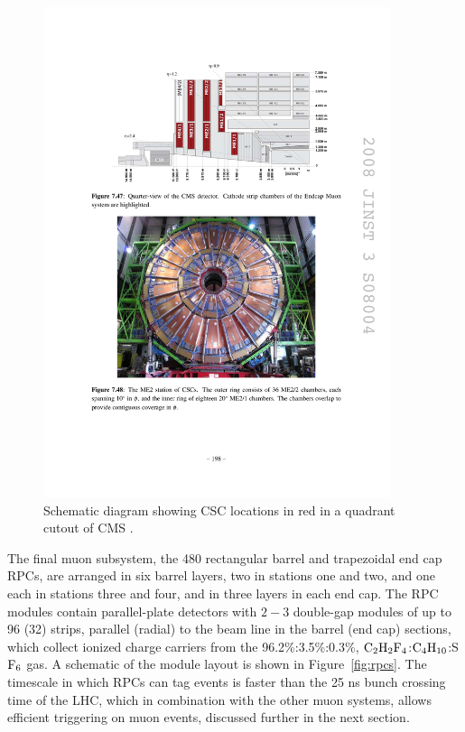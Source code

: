 \begin{figure}[tbh]
\centering
\includegraphics[width=4in]{figures/cscs.pdf}
\caption{Schematic diagram showing CSC locations in red in a quadrant cutout of CMS \cite{1748-0221-3-08-S08004}.}
\label{fig:cscs}
\end{figure}

The final muon subsystem, the 480 rectangular barrel and trapezoidal end cap RPCs, are arranged in six barrel layers, two in stations one and two, and one each in stations three and four, and in three layers in each end cap. The RPC modules contain parallel-plate detectors with $2-3$ double-gap modules of up to 96 (32) strips, parallel (radial) to the beam line in the barrel (end cap) sections, which collect ionized charge carriers from the 96.2\%:3.5\%:0.3\%, $\rm{C}_2\rm{H}_2\rm{F}_4$:$\rm{C}_4\rm{H}_{10}$:S$\rm{F}_6$ gas. A schematic of the module layout is shown in Figure~\ref{fig:rpcs}. The timescale in which RPCs can tag events is faster than the 25 ns bunch crossing time of the LHC, which in combination with the other muon systems, allows efficient triggering on muon events, discussed further in the next section.

